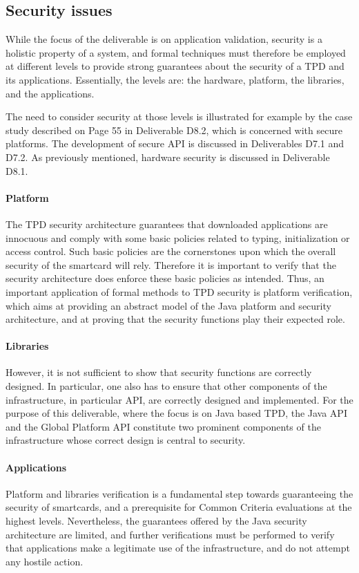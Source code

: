 \subsection{Security issues}
While the focus of the deliverable is on application validation,
security is a holistic property of a system, and formal techniques
must therefore be employed at different levels to provide strong
guarantees about the security of a TPD and its applications.
Essentially, the levels are: the hardware, platform, the libraries,
and the applications.

The need to consider security at those levels is illustrated for
example by the case study described on Page 55 in Deliverable D8.2,
which is concerned with secure platforms. The development of secure
API is discussed in Deliverables D7.1 and D7.2. As previously mentioned,
hardware security is discussed in Deliverable D8.1.


\paragraph*{Platform} The TPD security architecture guarantees that
downloaded applications are innocuous and comply with some basic
policies related to typing, initialization or access control. Such
basic policies are the cornerstones upon which the overall security of
the smartcard will rely. Therefore it is important to verify that the
security architecture does enforce these basic policies as
intended. Thus, an important application of formal methods to TPD
security is platform verification, which aims at providing an abstract
model of the Java platform and security architecture, and at proving
that the security functions play their expected role.

\paragraph*{Libraries} However, it is not sufficient to show that
security functions are correctly designed. In particular, one also has
to ensure that other components of the infrastructure, in particular
API, are correctly designed and implemented. For the purpose of this
deliverable, where the focus is on Java based TPD, the Java API and
the Global Platform API constitute two prominent components of the
infrastructure whose correct design is central to security. 


\paragraph*{Applications} 
Platform and libraries verification is a fundamental step towards
guaranteeing the security of smartcards, and a prerequisite for Common
Criteria evaluations at the highest levels. Nevertheless, the
guarantees offered by the Java security architecture are limited, and
further verifications must be performed to verify that applications
make a legitimate use of the infrastructure, and do not attempt any
hostile action.

